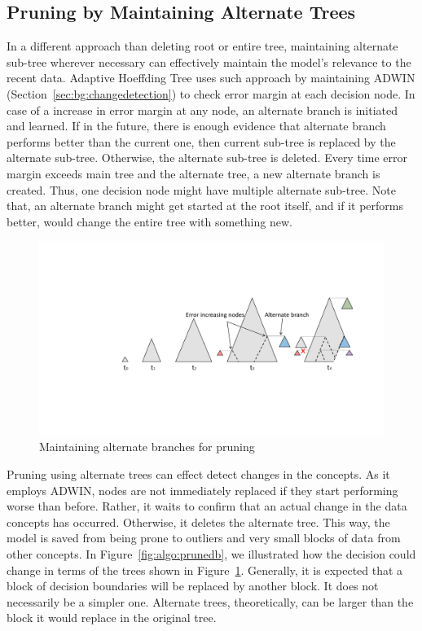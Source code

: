 \subsection{Pruning by Maintaining Alternate Trees}
In a different approach than deleting root or entire tree, maintaining alternate sub-tree wherever necessary can effectively maintain the model's relevance to the recent data. Adaptive Hoeffding Tree uses such approach by maintaining ADWIN (Section~\ref{sec:bg:changedetection}) to check error margin at each decision node. In case of a increase in error margin at any node, an alternate branch is initiated and learned. If in the future, there is enough evidence that alternate branch performs better than the current one, then current sub-tree is replaced by the alternate sub-tree. Otherwise, the alternate sub-tree is deleted. Every time error margin exceeds main tree and the alternate tree, a new alternate branch is created. Thus, one decision node might have multiple alternate sub-tree. Note that, an alternate branch might get started at the root itself, and if it performs better, would change the entire tree with something new.

\begin{figure}[htbp]
    \begin{center}
        \includegraphics[width=14.0cm]{figs/prune.pdf}
        \caption{Maintaining alternate branches for pruning}
        \label{fig:algo:prune}
    \end{center}
\end{figure}

Pruning using alternate trees can effect detect changes in the concepts. As it employs ADWIN, nodes are not immediately replaced if they start performing worse than before. Rather, it waits to confirm that an actual change in the data concepts has occurred. Otherwise, it deletes the alternate tree. This way, the model is saved from being prone to outliers and very small blocks of data from other concepts. In Figure~\ref{fig:algo:prunedb}, we illustrated how the decision could change in terms of the trees shown in Figure~\ref{fig:algo:prune}. Generally, it is expected that a block of decision boundaries will be replaced by another block. It does not necessarily be a simpler one. Alternate trees, theoretically, can be larger than the block it would replace in the original tree.

